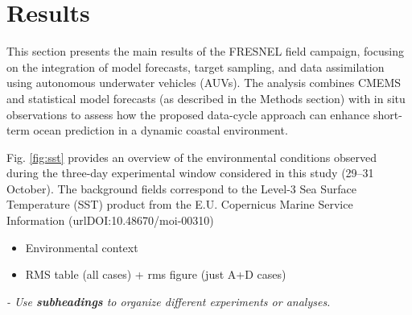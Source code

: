 \section{Results}
\label{sec:results}

This section presents the main results of the FRESNEL field campaign,
focusing on the integration of model forecasts, target sampling, and
data assimilation using autonomous underwater vehicles (AUVs). The
analysis combines CMEMS and statistical model forecasts (as described
in the Methods section) with in situ observations to assess how the
proposed data-cycle approach can enhance short-term ocean prediction
in a dynamic coastal environment.

Fig. \ref{fig:sst} provides an overview of the environmental
conditions observed during the three-day experimental window
considered in this study (29–31 October). The background fields
correspond to the Level-3 Sea Surface Temperature (SST) product from
the E.U. Copernicus Marine Service Information
(url{DOI:10.48670/moi-00310})


\begin{figure}
  \centering {}
\end{figure}

\begin{itemize}
    \item Environmental context
    \item RMS table (all cases) + rms figure (just A+D cases)
\end{itemize}

 
\textit{- Use \textbf{subheadings} to organize different experiments or analyses.}

